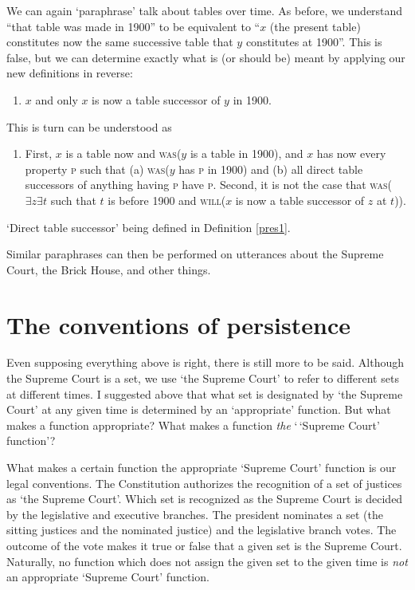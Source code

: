 \documentclass[11pt]{article}
\begin{document}
\begin{spacing}{1.5}
We can again `paraphrase' talk about tables over time.  As before, we
understand ``that table was made in 1900'' to be equivalent to ``$x$
(the present table) constitutes now the same successive table that $y$
constitutes at 1900''.  This is false, but we can determine exactly
what is (or should be) meant by applying our new definitions in
reverse:

\begin{enumerate}[label=3a.]
  \item $x$ and only $x$ is now a table successor of $y$ in 1900.
\end{enumerate}
This is turn can be understood as

\begin{enumerate}[label=2a.]
  \item First, $x$ is a table now and \textsc{was}($y$ is a table in
    1900), and $x$ has now every property \textsc{p} such that (a)
    \textsc{was}($y$ has \textsc{p} in 1900) and (b) all direct table
    successors of anything having \textsc{p} have \textsc{p}.  Second,
    it is not the case that \textsc{was}($\exists z \exists t$ such
    that $t$ is before 1900 and \textsc{will}($x$ is now a table
    successor of $z$ at $t$)).
\end{enumerate}
`Direct table successor' being defined in Definition \ref{pres1}.

Similar paraphrases can then be performed on utterances about the
Supreme Court, the Brick House, and other things.

\section{The conventions of persistence}
\label{set-convention}
Even supposing everything above is right, there is still more to be
said.  Although the Supreme Court is a set, we use `the Supreme Court'
to refer to different sets at different times.  I suggested above that
what set is designated by `the Supreme Court' at any given time is
determined by an `appropriate' function.  But what makes a function
appropriate?  What makes a function {\em the} `\,`Supreme Court'
function'?

What makes a certain function the appropriate `Supreme Court' function
is our legal conventions.  The Constitution authorizes the recognition
of a set of justices as `the Supreme Court'.  Which set is recognized
as the Supreme Court is decided by the legislative and executive
branches.  The president nominates a set (the sitting justices and the
nominated justice) and the legislative branch votes.  The outcome of
the vote makes it true or false that a given set is the Supreme
Court.  Naturally, no function which does not assign the given set to
the given time is {\em not} an appropriate `Supreme Court' function.


\end{spacing}
\end{document}
